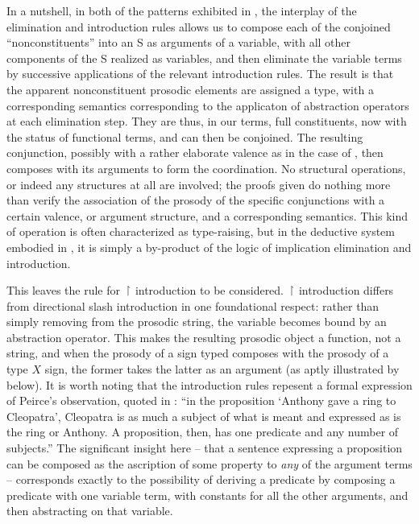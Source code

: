 \documentclass[output=paper,colorlinks,citecolor=brown]{langscibook}
\begin{document}
In a nutshell, in both of the patterns exhibited in , the
interplay of the elimination and introduction rules allows us to
compose each of the conjoined ``nonconstituents'' into an S as arguments
of a variable, with all other components of the S realized as
variables, and then eliminate the variable terms by successive
applications of the relevant introduction rules. The result is that
the apparent nonconstituent prosodic elements are assigned a type,
with a corresponding semantics corresponding to the applicaton of
abstraction operators at each elimination step. They are thus, in our
terms, full constituents, now with the status of functional terms, and
can then be conjoined. The resulting conjunction, possibly with a
rather elaborate valence as in the case of , then composes with
its arguments to form the coordination. No structural operations, or
indeed any structures at all are involved; the proofs given do
nothing more than verify the association of the prosody of the
specific conjunctions with a certain valence, or argument structure,
and a corresponding semantics. This kind of operation is often
characterized as type-raising, but in the deductive system embodied in
, it is simply a by-product of the logic of implication
elimination and introduction.

This leaves the rule for \ensuremath{\vs} introduction to be considered. \ensuremath{\vs}
introduction differs from directional slash introduction in one
foundational respect: rather than simply removing \pt{ \ensuremath{\greekp} } from the
prosodic string, the variable becomes bound by an abstraction
operator. This makes the resulting prosodic object a function, not a
string, and when the prosody of a sign typed  composes with
the prosody of a type $X$ sign, the former takes the latter as an
argument (as aptly illustrated by  below).  It is worth
noting that the introduction rules repesent a formal expression of
Peirce's observation, quoted in \citet[8]{nothPeirce}: ``in the proposition
{`}Anthony gave a ring to Cleopatra', Cleopatra is as much a subject of what is
meant and expressed as is the ring or Anthony. A proposition, then,
has one predicate and any number of subjects.'' The significant insight
here -- that a sentence expressing a proposition can be composed as the
ascription of some property to \textsl{any} of the argument
terms -- corresponds exactly to the possibility of deriving a predicate
by composing a predicate with one variable term, with constants for
all the other arguments, and then abstracting on that
variable.
\end{document}
